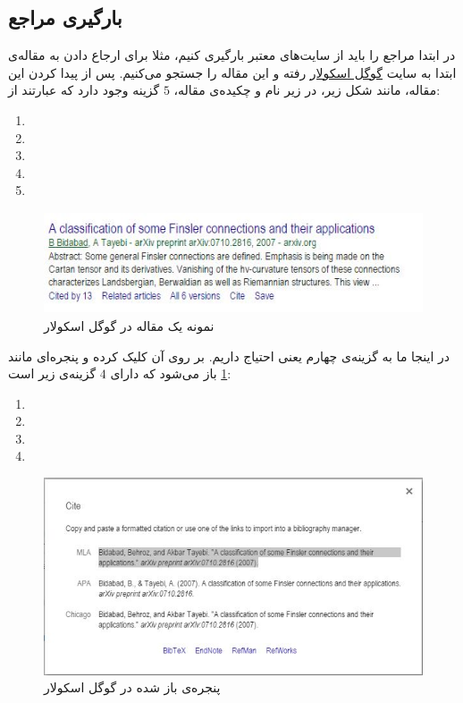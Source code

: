 \subsection{بارگیری مراجع}
در ابتدا مراجع را باید از سایت‌های معتبر بارگیری کنیم، مثلا برای ارجاع دادن به مقاله‌ی
ابتدا به سایت
\href{scholar.google.com}{گوگل اسکولار} 
رفته و این مقاله را جستجو می‌کنیم. پس از پیدا کردن این مقاله، مانند شکل زیر، در زیر نام و چکیده‌ی مقاله، $5$ گزینه وجود دارد که عبارتند از:\\

\begin{enumerate}
\item {}

\item {}

\item {}

\item {}

\item {}
\end{enumerate}
\begin{figure}[!h]
\includegraphics[height=3cm]{bidabad}
\caption{نمونه یک مقاله در گوگل اسکولار}
\end{figure}
در اینجا ما به گزینه‌ی چهارم یعنی
احتیاج داریم. بر روی آن کلیک کرده و پنجره‌ای مانند
\cref{fig.2}
باز می‌شود که دارای $4$ گزینه‌ی زیر است:
\begin{enumerate}
\item {}

\item {}

\item {}

\item {}
\end{enumerate}
\begin{figure}
\centering\includegraphics[scale=.6]{bibref}
\caption{پنجره‌ی باز شده در گوگل اسکولار}\label{fig.2}
\end{figure}
